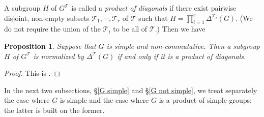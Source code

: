 \documentclass[11pt,oneside,reqno]{amsart}
\theoremstyle{plain}
\newtheorem{proposition}[theorem]{Proposition}
\begin{document}
	A subgroup $H$ of $G^{\mathcal{T}}$ is called a \textit{product of diagonals} if there exist pairwise disjoint, non-empty subsets $\mathcal{T}_1,\cdots,\mathcal{T}_r$ of $\mathcal{T}$ such that
	$H=\prod_{i=1}^r\Delta^{\mathcal{T}_i}(G)$.
	(We do not require the union of the $\mathcal{T}_i$ to be all of $\mathcal{T}$.)
	Then we have
	\begin{proposition}\label{product of diagonals}
		Suppose that $G$ is simple and non-commutative. Then a subgroup $H$ of $G^{\mathcal{T}}$ is normalized by $\Delta^{\mathcal{T}}(G)$ if and only if it is a product of diagonals.
	\end{proposition}
	\begin{proof}
		This is \cite[Proposition 3.10]{Cornut2002}.
	\end{proof}
	
	
	In the next two subsections, §\ref{G simple} and §\ref{G not simple}, we treat separately the case where $G$ is simple and the case where $G$ is a product of simple groups; the latter is built on the former.
	
	
\end{document}
